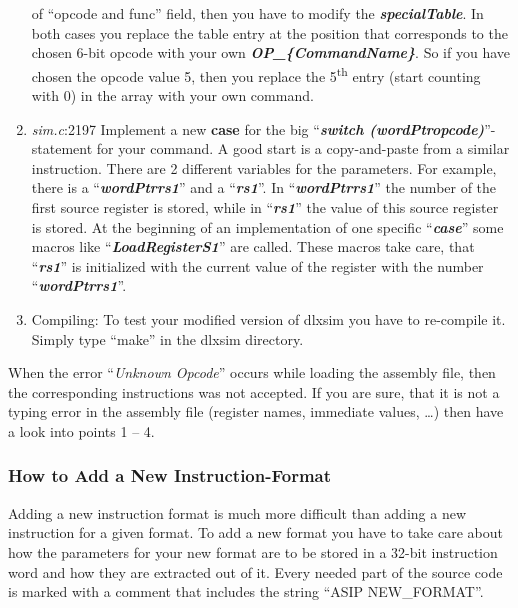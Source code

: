 \documentclass[
]{article}
\begin{document}
\begin{enumerate}
  of ``opcode and func'' field, then you have to modify the
  \emph{\textbf{specialTable}}. In both cases you replace the table
  entry at the position that corresponds to the chosen 6-bit opcode with
  your own \emph{\textbf{OP\_\{CommandName\}}}. So if you have chosen
  the opcode value 5, then you replace the 5\textsuperscript{th} entry
  (start counting with 0) in the array with your own command.
\item
  \emph{sim.c}:2197 Implement a new \textbf{case} for the big
  ``\emph{\textbf{switch (wordPtropcode)}}''-statement for your command.
  A good start is a copy-and-paste from a similar instruction. There are
  2 different variables for the parameters. For example, there is a
  ``\emph{\textbf{wordPtrrs1}}'' and a ``\emph{\textbf{rs1}}''. In
  ``\emph{\textbf{wordPtrrs1}}'' the number of the first source register
  is stored, while in ``\emph{\textbf{rs1}}'' the value of this source
  register is stored. At the beginning of an implementation of one
  specific ``\emph{\textbf{case}}'' some macros like
  ``\emph{\textbf{LoadRegisterS1}}'' are called. These macros take care,
  that ``\emph{\textbf{rs1}}'' is initialized with the current value of
  the register with the number ``\emph{\textbf{wordPtrrs1}}''.
\item
  Compiling: To test your modified version of dlxsim you have to
  re-compile it. Simply type ``make'' in the dlxsim directory.
\end{enumerate}

When the error ``\emph{Unknown Opcode}'' occurs while loading the
assembly file, then the corresponding instructions was not accepted. If
you are sure, that it is not a typing error in the assembly file
(register names, immediate values, \ldots) then have a look into points
1 -- 4.

\hypertarget{how-to-add-a-new-instruction-format}{%
\subsubsection{How to Add a New
Instruction-Format}\label{how-to-add-a-new-instruction-format}}

Adding a new instruction format is much more difficult than adding a new
instruction for a given format. To add a new format you have to take
care about how the parameters for your new format are to be stored in a
32-bit instruction word and how they are extracted out of it. Every
needed part of the source code is marked with a comment that includes
the string ``ASIP NEW\_FORMAT''.
\end{document}
